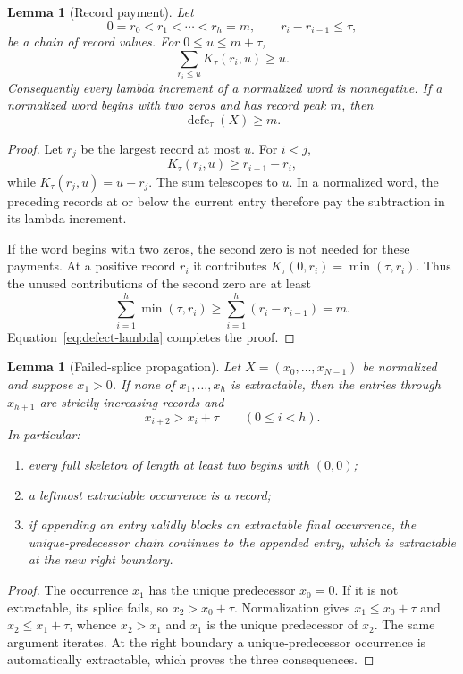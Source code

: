 \documentclass[11pt]{article}
\newtheorem{lemma}[theorem]{Lemma}
\theoremstyle{definition}
\theoremstyle{remark}
\newcommand{\defc}{\operatorname{defc}}
\begin{document}
\begin{lemma}[Record payment]
\label{lem:record-payment}
Let
\[
  0=r_0<r_1<\cdots<r_h=m,
  \qquad r_i-r_{i-1}\le\tau,
\]
be a chain of record values.  For $0\le u\le m+\tau$,
\[
  \sum_{r_i\le u}K_\tau(r_i,u)\ge u.
\]
Consequently every lambda increment of a normalized word is nonnegative.
If a normalized word begins with two zeros and has record peak $m$, then
\[
  \defc_\tau(X)\ge m.
\]
\end{lemma}

\begin{proof}
Let $r_j$ be the largest record at most $u$.  For $i<j$,
\[
  K_\tau(r_i,u)\ge r_{i+1}-r_i,
\]
while $K_\tau(r_j,u)=u-r_j$.  The sum telescopes to $u$.  In a normalized
word, the preceding records at or below the current entry therefore pay the
subtraction in its lambda increment.

If the word begins with two zeros, the second zero is not needed for these
payments.  At a positive record $r_i$ it contributes
$K_\tau(0,r_i)=\min(\tau,r_i)$.  Thus the unused contributions of the second
zero are at least
\[
  \sum_{i=1}^h\min(\tau,r_i)
  \ge\sum_{i=1}^h(r_i-r_{i-1})=m.
\]
Equation~\eqref{eq:defect-lambda} completes the proof.
\end{proof}

\begin{lemma}[Failed-splice propagation]
\label{lem:propagation}
Let $X=(x_0,\ldots,x_{N-1})$ be normalized and suppose $x_1>0$.  If none
of $x_1,\ldots,x_h$ is extractable, then the entries through $x_{h+1}$ are
strictly increasing records and
\begin{equation}
  x_{i+2}>x_i+\tau
  \qquad(0\le i<h).
  \label{eq:rapid}
\end{equation}
In particular:
\begin{enumerate}
\item every full skeleton of length at least two begins with $(0,0)$;
\item a leftmost extractable occurrence is a record;
\item if appending an entry validly blocks an extractable final occurrence,
the unique-predecessor chain continues to the appended entry, which is
extractable at the new right boundary.
\end{enumerate}
\end{lemma}

\begin{proof}
The occurrence $x_1$ has the unique predecessor $x_0=0$.  If it is not
extractable, its splice fails, so $x_2>x_0+\tau$.  Normalization gives
$x_1\le x_0+\tau$ and $x_2\le x_1+\tau$, whence $x_2>x_1$ and $x_1$ is
the unique predecessor of $x_2$.  The same argument iterates.  At the right
boundary a unique-predecessor occurrence is automatically extractable, which
proves the three consequences.
\end{proof}
\end{document}

